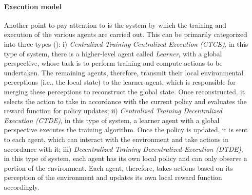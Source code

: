\documentclass[12pt,a4paper,openright,twoside]{book}
\begin{document}
\paragraph{Execution model}
   
Another point to pay attention to is the system by which the training and execution of the various agents are carried out. This can be primarily categorized into three types ():
    i) \emph{Centralized Training Centralized Execution (CTCE)}, in this type of system, there is a higher-level agent called \emph{Learner}, with a global perspective, whose task is to perform training and compute actions to be undertaken. The remaining agents, therefore, transmit their local environmental perceptions (i.e., the local state) to the learner agent, which is responsible for merging these perceptions to reconstruct the global state. Once reconstructed, it selects the action to take in accordance with the current policy and evaluates the reward function for policy updates;
    ii) \emph{Centralized Training Decentralized Execution (CTDE)}, in this type of system, a learner agent with a global perspective executes the training algorithm. Once the policy is updated, it is sent to each agent, which can interact with the environment and take actions in accordance with it;
    iii) \emph{Decentralized Training Decentralized Execution (DTDE)}, in this type of system, each agent has its own local policy and can only observe a portion of the environment. Each agent, therefore, takes actions based on its perception of the environment and updates its own local reward function accordingly.
\end{document}
